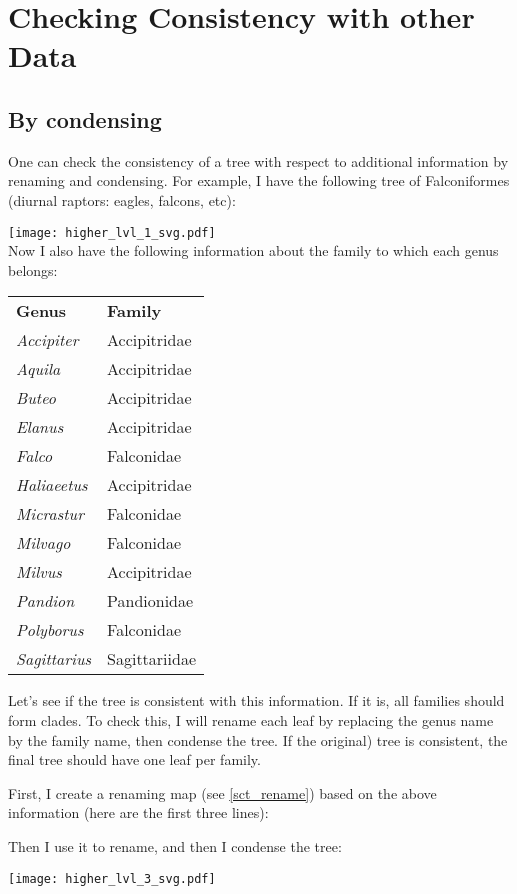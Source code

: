 \section{Checking Consistency with other Data}
\label{sct_higher_lvl}

\subsection{By condensing}

One can check the consistency of a tree with respect to additional information
by renaming and condensing. For example, I have the following tree of
Falconiformes (diurnal raptors: eagles, falcons, etc):

\texttt{[image: higher\_lvl\_1\_svg.pdf]} \\

\noindent{}Now I also have the following information about the family to which each genus belongs:

\bigskip{}
\begin{tabular}{ll}
\textbf{Genus} & \textbf{Family} \\
\textit{Accipiter} & Accipitridae \\
\textit{Aquila} & Accipitridae \\
\textit{Buteo} & Accipitridae \\
\textit{Elanus} & Accipitridae \\
\textit{Falco} & Falconidae \\
\textit{Haliaeetus} & Accipitridae \\
\textit{Micrastur} & Falconidae \\
\textit{Milvago} & Falconidae \\
\textit{Milvus} & Accipitridae \\
\textit{Pandion} & Pandionidae \\
\textit{Polyborus} & Falconidae \\
\textit{Sagittarius} & Sagittariidae
\end{tabular}
\bigskip{}

Let's see if the tree is consistent with this information. If it is, all
families should form clades. To check this, I will rename each leaf by
replacing the genus name by the family name, then condense the tree. If the
original) tree is consistent, the final tree should have one leaf per family.

First, I create a renaming map (see \ref{sct_rename}) based on the above
information (here are the first three lines):


Then I use it to rename, and then I condense the tree:

\texttt{[image: higher\_lvl\_3\_svg.pdf]}

